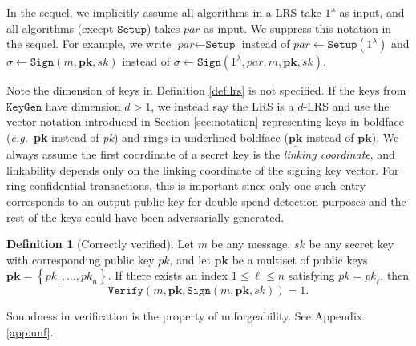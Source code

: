 \documentclass{mrl}
\theoremstyle{plain}
\theoremstyle{definition}
\newtheorem{definition}{Definition}[section]
\begin{document}
In the sequel, we implicitly assume all algorithms in a LRS take $1^\lambda$ as input, and all algorithms (except $\texttt{Setup}$) takes $\textit{par}$ as input. We suppress this notation in the sequel. For example, we write $\textit{par} \leftarrow \texttt{Setup}$ instead of $\textit{par} \leftarrow \texttt{Setup}(1^\lambda)$ and $\sigma \leftarrow \texttt{Sign}(m, \textbf{pk}, \textit{sk})$ instead of $\sigma \leftarrow \texttt{Sign}(1^\lambda, \textit{par}, m, \textbf{pk}, \textit{sk})$.

Note the dimension of keys in Definition \ref{def:lrs} is not specified. If the keys from $\texttt{KeyGen}$ have dimension $d > 1$, we instead say the LRS is a $d$-LRS and use the vector notation introduced in Section \ref{sec:notation} representing keys in boldface (\textit{e.g.}\ \textbf{pk} instead of \textit{pk}) and rings in underlined boldface ($\underline{\textbf{pk}}$ instead of $\textbf{pk}$). We always assume the first coordinate of a secret key is the \textit{linking coordinate}, and linkability depends only on the linking coordinate of the signing key vector. For ring confidential transactions, this is important since only one such entry corresponds to an output public key for double-spend detection purposes and the rest of the keys could have been adversarially generated.

\begin{definition}[Correctly verified]
Let $m$ be any message, $\textit{sk}$ be any secret key with corresponding public key $\textit{pk}$, and let $\textbf{pk}$ be a multiset of public keys $\textbf{pk} = \left\{\textit{pk}_1, \ldots, \textit{pk}_n\right\}$. If there exists an index $1 \leq \ell \leq n$ satisfying $\textit{pk} = \textit{pk}_\ell$, then \[\texttt{Verify}(m, \textbf{pk}, \texttt{Sign}(m, \textbf{pk}, \textit{sk})) = 1.\]
\end{definition}
Soundness in verification is the property of unforgeability. See Appendix \ref{app:unf}.
\end{document}
